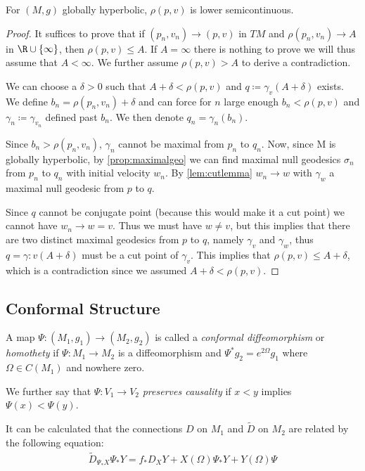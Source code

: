 \begin{proposition}
For $(M,g)$ globally hyperbolic, $\rho(p,v)$ is lower semicontinuous.
\end{proposition}
\begin{proof}It suffices to prove that if $(p_n,v_n)\to(p,v)$ in $TM$ and $\rho(p_n,v_n)\to A$ in $\R \cup \{\infty\}$, then $\rho(p,v)\leq A$. If $A=\infty$ there is nothing to prove we will thus assume that $A<\infty$. We further assume $\rho(p,v)>A$ to derive a contradiction.

We can choose a $\delta>0$ such that $A+\delta<\rho(p,v)$ and $q\coloneqq\gamma_v(A+\delta)$ exists.
We define $b_n = \rho(p_n,v_n)+\delta$ and can force for $n$ large enough $b_n<\rho(p,v)$ and $\gamma_n\coloneqq\gamma_{v_n}$ defined past $b_n$. We then denote $q_n = \gamma_n(b_n)$.  

Since $b_n>\rho(p_n,v_n)$, $\gamma_n$ cannot be maximal from $p_n$ to $q_n$. 
Now, since M is globally hyperbolic, by \ref{prop:maximalgeo} we can find maximal null geodesics $\sigma_n$ from $p_n$ to $q_n$ with initial velocity $w_n$. By \ref{lem:cutlemma} $w_n\to w$ with $\gamma_w$ a maximal null geodesic from $p$ to $q$. 

Since $q$ cannot be conjugate point (because this would make it a cut point) we cannot have $w_n\to w = v$. Thus we must have $w\neq v$, but this implies that there are two distinct maximal geodesics from $p$ to $q$, namely $\gamma_v$ and $\gamma_w$, thus $q=\gamma:v(A+\delta)$ must be a cut point of $\gamma_v$. This implies that $\rho(p,v)\leq A + \delta$, which is a contradiction since we assumed $A+\delta<\rho(p,v)$.
\end{proof}



\subsection{Conformal Structure}
\begin{definition}
A map $\Psi:(M_1,g_1)\to(M_2,g_2)$ is called a \emph{conformal diffeomorphism} or \emph{homothety} if $\Psi:M_1\to M_2$ is a diffeomorphism and $\Psi^*g_2=e^{2\Omega}g_1$ where $\Omega\in C(M_1)$ and nowhere zero.

We further say that $\Psi:V_1\to V_2$ \emph{preserves causality} if $x<y$ implies $\Psi(x)<\Psi(y)$.
\end{definition}

It can be calculated that the connections $D$ on $M_1$ and $\widetilde{D}$ on $M_2$ are related by the following equation:
\begin{align}
    \widetilde{D}_{\Psi_*X}\Psi_*Y = f_*D_XY + X(\Omega)\Psi_*Y + Y(\Omega)\Psi
\end{align}

